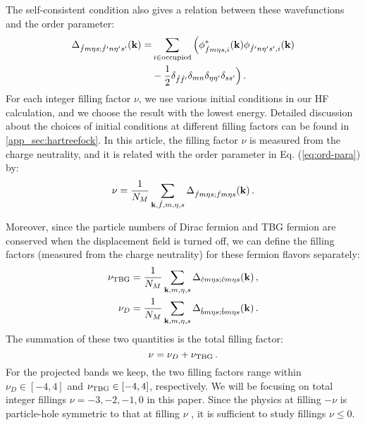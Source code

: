 \documentclass[prb,aps,nofootinbib,amssymb,twocolumn,superscriptaddress,10pt]{revtex4-2}
\begin{document}
The self-consistent condition also gives a relation between these wavefunctions and the order parameter:
\begin{align}
	\Delta_{\hat{f}m\eta s;\hat{f}'n\eta's'}(\mathbf{k}) =& \sum_{i\in{\rm occupied}}\Big{(}\phi^*_{\hat{f}m\eta s, i}(\mathbf{k})\phi_{\hat{f}'n\eta's', i}(\mathbf{k})\nonumber\\
	& - \frac12 \delta_{\hat{f}\hat{f}'}\delta_{mn}\delta_{\eta\eta'}\delta_{ss'}\Big{)}\,.\label{eq:ord-para}
\end{align}
For each integer filling factor $\nu$, we use various initial conditions in our HF calculation, and we choose the result with the lowest energy.
Detailed discussion about the choices of initial conditions at different filling factors can be found in \ref{app_sec:hartreefock}. In this article, the filling factor $\nu$ is measured from the charge neutrality, and it is related with the order parameter in Eq. (\ref{eq:ord-para}) by:
\begin{equation}
	\nu = \frac{1}{N_M}\sum_{\mathbf{k},\hat{f},m,\eta,s}\Delta_{\hat{f} m \eta s; \hat{f} m \eta s}(\mathbf{k})\,.
\end{equation}

Moreover, since the particle numbers of Dirac fermion and TBG fermion are conserved when the displacement field is turned off, we can define the filling factors (measured from the charge neutrality) for these fermion flavors separately:
\begin{align}
	\nu_{\rm TBG} &= \frac{1}{N_M}\sum_{\mathbf{k}, m, \eta, s}\Delta_{\hat{c} m \eta s; \hat{c} m \eta s}(\mathbf{k})\,,\\
	\nu_D &= \frac{1}{N_M}\sum_{\mathbf{k}, m, \eta, s}\Delta_{\hat{b} m \eta s; \hat{b} m \eta s}(\mathbf{k})\,.
\end{align}
The summation of these two quantities is the total filling factor: 
\begin{equation}
\nu = \nu_D + \nu_{\rm TBG}\,.
\end{equation}
For the projected bands we keep, the two filling factors range within $\nu_D\in[-4,4]$ and $\nu_{\rm TBG}\in [-4,4]$, respectively. We will be focusing on total integer fillings $\nu=-3,-2,-1,0$ in this paper. Since the physics at filling $-\nu$ is particle-hole symmetric to that at filling $\nu$ \cite{TSTGI}, it is sufficient to study fillings $\nu\le 0$.
\end{document}
